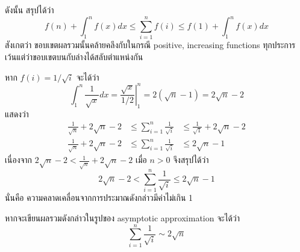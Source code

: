 ดังนั้น สรุปได้ว่า \[f(n)+\int_1^n{f(x)dx} \leq \sum_{i=1}^{n}{f(i)} \leq f(1)+\int_1^n{f(x)dx}\] สังเกตว่า ขอบเขตผลรวมนั้นคล้ายคลึงกับในกรณี positive, increasing functions ทุกประการ เว้นแต่ว่าขอบเขตบนกับล่างได้สลับตำแหน่งกัน

\begin{example}
หาก $f(i)=1/\sqrt{i}$ จะได้ว่า \[\int_1^n{\frac{1}{\sqrt{x}}dx}=\left.\frac{\sqrt{x}}{1/2}\right|_1^n=2(\sqrt{n}-1)=2\sqrt{n}-2\] แสดงว่า \[
\begin{array}{rcl}
\frac{1}{\sqrt{n}}+2\sqrt{n}-2 &\leq \sum_{i=1}^{n}{\frac{1}{\sqrt{i}}} &\leq \frac{1}{\sqrt{1}}+2\sqrt{n}-2 \\
\frac{1}{\sqrt{n}}+2\sqrt{n}-2 &\leq \sum_{i=1}^{n}{\frac{1}{\sqrt{i}}} &\leq 2\sqrt{n}-1
\end{array}
\]
เนื่องจาก $2\sqrt{n}-2<\frac{1}{\sqrt{n}}+2\sqrt{n}-2$ เมื่อ $n>0$ จึงสรุปได้ว่า \[2\sqrt{n}-2 < \sum_{i=1}^{n}{\frac{1}{\sqrt{i}}} \leq 2\sqrt{n}-1
\]
นั่นคือ ความคลาดเคลื่อนจากการประมาณดังกล่าวมีค่าไม่เกิน 1

หากจะเขียนผลรวมดังกล่าวในรูปของ asymptotic approximation จะได้ว่า \[\sum_{i=1}^{n}{\frac{1}{\sqrt{i}}}\sim 2\sqrt{n}\]
\end{example}
